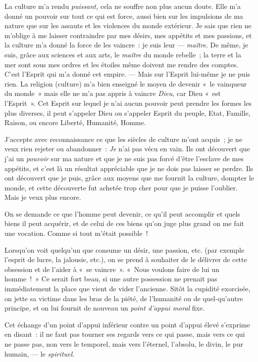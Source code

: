 \documentclass[french,twoside]{book} %
\begin{document}
La culture m’a rendu \emph{puissant,} cela ne souffre non plus aucun doute. Elle m’a donné un pouvoir sur tout ce qui est force, aussi bien sur les impulsions de ma nature que sur les assauts et les violences du monde  extérieur. Je sais que rien ne m’oblige à me laisser contraindre par mes désirs, mes appétits et mes passions, et la culture m’a donné la force de les vaincre : je suis leur — \emph{maître}. De même, je suis, grâce aux sciences et aux arts, le \emph{maître} du monde rebelle ; la terre et la mer sont sous mes ordres et les étoiles même doivent me rendre des comptes. C’est l’Esprit qui m’a donné cet empire. — Mais sur l’Esprit lui-même je ne puis rien. La religion (culture) m’a bien enseigné le moyen de devenir « le vainqueur du monde » mais elle ne m’a pas appris à vaincre \emph{Dieu,} car Dieu « est l’Esprit ». Cet Esprit sur lequel je n’ai aucun pouvoir peut prendre les formes les plus diverses, il peut s’appeler Dieu ou s’appeler Esprit du peuple, Etat, Famille, Raison, ou encore Liberté, Humanité, Homme.\par
J’accepte avec reconnaissance ce que les siècles de culture m’ont acquis ; je ne veux rien rejeter ou abandonner : \emph{Je} n’ai pas vécu en vain. Ils ont découvert que j’ai un \emph{pouvoir} sur ma nature et que je ne suis pas forcé d’être l’esclave de mes appétits, et c’est là un résultat appréciable que je ne dois pas laisser se perdre. Ils ont découvert que je puis, grâce aux moyens que me fournit la culture, dompter le monde, et cette découverte fut achetée trop cher pour que je puisse l’oublier. Mais je veux plus encore.\par
On se demande ce que l’homme peut devenir, ce qu’il peut accomplir et quels biens il peut acquérir, et de celui de ces biens qu’on juge plus grand on me fait une vocation. Comme si tout m’était possible !\par
Lorsqu’on voit quelqu’un que consume un désir, une passion, etc. (par exemple l’esprit de lucre, la jalousie, etc.), on se prend à souhaiter de le délivrer de cette obsession et de l’aider à « se vaincre ». « Nous voulons faire de lui un homme ! » Ce serait fort beau, si une autre possession ne prenait pas immédiatement la place que vient de vider l’ancienne. Sitôt la cupidité exorcisée, on jette sa victime dans  les bras de la piété, de l’humanité ou de quel-qu’autre principe, et on lui fournit de nouveau un \emph{point d’appui moral} fixe.\par
Cet échange d’un point d’appui inférieur contre un point d’appui élevé s’exprime en disant : il ne faut pas tourner ses regards vers ce qui passe, mais vers ce qui ne passe pas, non vers le temporel, mais vers l’éternel, l’absolu, le divin, le pur humain, — le \emph{spirituel}.\par
\end{document}
